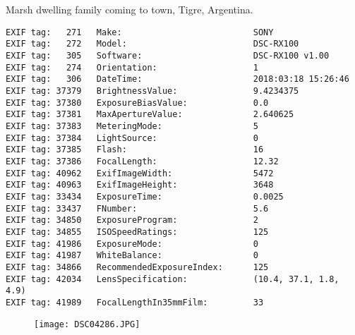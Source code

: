 \section{\protect{}}
\noindent Marsh dwelling family coming to town, Tigre, Argentina.
\noindent
\begin{lstlisting}
EXIF tag:   271   Make:                          SONY
EXIF tag:   272   Model:                         DSC-RX100
EXIF tag:   305   Software:                      DSC-RX100 v1.00
EXIF tag:   274   Orientation:                   1
EXIF tag:   306   DateTime:                      2018:03:18 15:26:46
EXIF tag: 37379   BrightnessValue:               9.4234375
EXIF tag: 37380   ExposureBiasValue:             0.0
EXIF tag: 37381   MaxApertureValue:              2.640625
EXIF tag: 37383   MeteringMode:                  5
EXIF tag: 37384   LightSource:                   0
EXIF tag: 37385   Flash:                         16
EXIF tag: 37386   FocalLength:                   12.32
EXIF tag: 40962   ExifImageWidth:                5472
EXIF tag: 40963   ExifImageHeight:               3648
EXIF tag: 33434   ExposureTime:                  0.0025
EXIF tag: 33437   FNumber:                       5.6
EXIF tag: 34850   ExposureProgram:               2
EXIF tag: 34855   ISOSpeedRatings:               125
EXIF tag: 41986   ExposureMode:                  0
EXIF tag: 41987   WhiteBalance:                  0
EXIF tag: 34866   RecommendedExposureIndex:      125
EXIF tag: 42034   LensSpecification:             (10.4, 37.1, 1.8, 4.9)
EXIF tag: 41989   FocalLengthIn35mmFilm:         33

\end{lstlisting}
\clearpage
\begin{figure}
\raggedleft
\texttt{[image: DSC04286.JPG]}
\end{figure}


\clearpage
